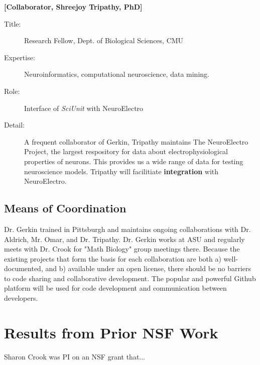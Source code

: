 \documentclass[11pt,letterpaper]{article}
\begin{document}
\textbf{[Collaborator, Shreejoy Tripathy, PhD]}
\begin{description}
\item[Title:] Research Fellow, Dept. of Biological Sciences, CMU
\item[Expertise:] Neuroinformatics, computational neuroscience, data mining.    
\item[Role:] Interface of \textit{SciUnit} with NeuroElectro
\item[Detail:] A frequent collaborator of Gerkin, Tripathy maintains The NeuroElectro Project, the largest respository for data about electrophysiological properties of neurons.  This provides us a wide range of data for testing neuroscience models.  Tripathy will facilitiate \textbf{integration} with NeuroElectro.  
\end{description}

\subsection{Means of Coordination}
Dr. Gerkin trained in Pittsburgh and maintains ongoing collaborations with Dr. Aldrich, Mr. Omar, and Dr. Tripathy.  Dr. Gerkin works at ASU and regularly meets with Dr. Crook for "Math Biology" group meetings there.  Because the existing projects that form the basis for each collaboration are both a) well-documented, and b) available under an open license, there should be no barriers to code sharing and collaborative development.  The popular and powerful Github platform will be used for code development and communication between developers.

\section{Results from Prior NSF Work}
Sharon Crook was PI on an NSF grant that... 
\end{document}
